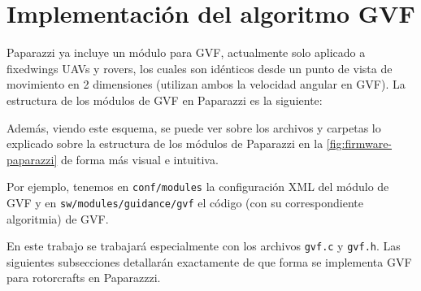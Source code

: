 
\section{Implementación del algoritmo GVF}

Paparazzi ya incluye un módulo para GVF, actualmente solo aplicado a fixedwings UAVs y rovers, los cuales son idénticos desde un punto de vista de movimiento en 2 dimensiones (utilizan ambos la velocidad angular en GVF). La estructura de los módulos de GVF en Paparazzi es la siguiente:

\vspace{8mm}



\vspace{8mm}

Además, viendo este esquema, se puede ver sobre los archivos y carpetas
lo explicado sobre la estructura de los módulos de Paparazzi en la \autoref{fig:firmware-paparazzi} de forma más visual e intuitiva.

Por ejemplo, tenemos en \texttt{conf/modules} la configuración XML del módulo de GVF
y en \texttt{sw/modules/guidance/gvf} el código (con su correspondiente algoritmia) de GVF.

En este trabajo se trabajará especialmente con los archivos \texttt{gvf.c} y \texttt{gvf.h}. 
Las siguientes subsecciones detallarán exactamente de que forma se implementa GVF para rotorcrafts en Paparazzzi.


